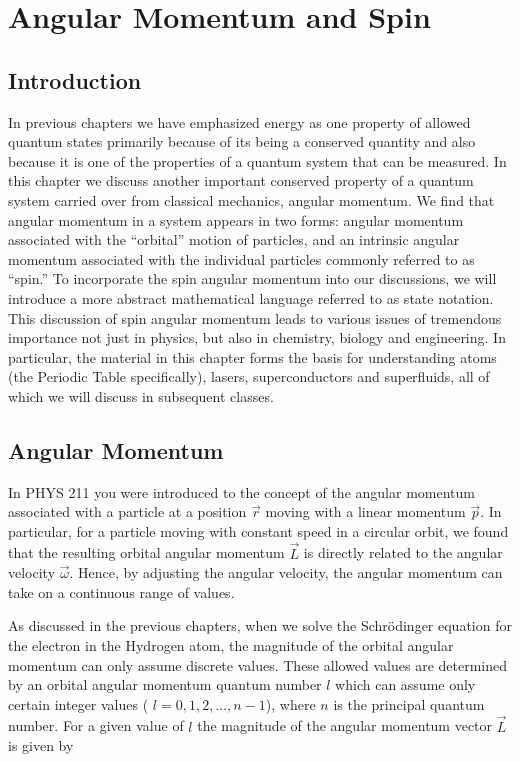 

\chapter[Angular Momentum and Spin]{Angular Momentum and Spin}
\label{chapter:spin}

\section{Introduction}

In previous chapters we have emphasized energy as one property of allowed quantum states primarily because of its being a conserved quantity and also because it is one of the properties of a quantum system that can be measured.  In this chapter we discuss another important conserved property of a quantum system carried over from classical mechanics, angular momentum.  We find that angular momentum in a system appears in two forms: angular momentum associated with the ``orbital'' motion of particles, and an intrinsic angular momentum associated with the individual particles commonly referred to as ``spin.'' To incorporate the spin angular momentum into our discussions, we will introduce a more abstract mathematical language referred to as state notation.  This discussion of spin angular momentum leads to
various issues of tremendous importance not just in physics, but
also in chemistry, biology and engineering.  In particular, the
material in this chapter forms the basis for understanding atoms
(the Periodic Table specifically), lasers, superconductors and
superfluids, all of which we will discuss in subsequent classes.

\section{Angular Momentum}

In PHYS 211 you were introduced to the concept of the angular momentum associated with a particle at a position $\vec{r}$ moving with a linear momentum $\vec{p}$.  In particular, for a particle moving with constant speed in a circular orbit, we found that the resulting orbital angular momentum $\vec{L}$ is directly related to the angular velocity $\vec{\omega}$.  Hence, by adjusting the angular velocity, the angular momentum can take on a continuous range of values.

As discussed in the previous chapters, when we solve the Schr\"{o}dinger equation for the electron in the Hydrogen atom, the magnitude of the orbital angular momentum can only assume discrete values. These allowed values are determined by an orbital angular momentum quantum number $l$ which can assume only certain integer values ( $l = 0, 1, 2,\ldots, n-1$), where $n$ is the principal quantum number.  For a given value of $l$ the magnitude of the angular momentum vector $\vec{L}$ is given by

